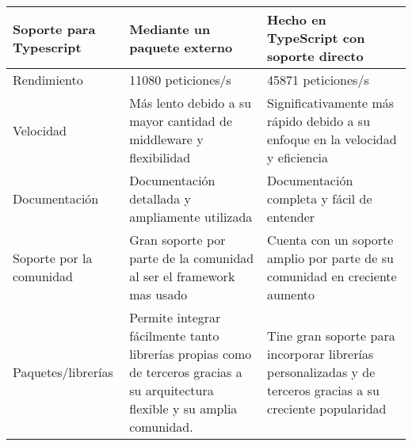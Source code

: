 \begin{longtable}{|p{3cm}|p{5cm}|p{5cm}|}
    \hline \hline
    \endlastfoot
    Soporte para Typescript                        & Mediante un paquete externo                                                                                                    & Hecho en TypeScript con soporte directo                                                                     \\\hline
    Rendimiento                                    & 11080 peticiones/s                                                                                                             & 45871 peticiones/s                                                                                          \\\hline
    Velocidad                                      & Más lento debido a su mayor cantidad de middleware y flexibilidad                                                              & Significativamente más rápido debido a su enfoque en la velocidad y eficiencia                              \\\hline
    Documentación                                  & Documentación detallada y ampliamente utilizada                                                                                & Documentación completa y fácil de entender                                                                  \\\hline
    Soporte por la comunidad                       & Gran soporte por parte de la comunidad al ser el framework mas usado                                                           & Cuenta con un soporte amplio por parte de su comunidad en creciente aumento                                 \\\hline
    Paquetes/librerías                             & Permite integrar fácilmente tanto librerías propias como de terceros gracias a su arquitectura flexible y su amplia comunidad. & Tine gran soporte para incorporar librerías personalizadas y de terceros gracias a su creciente popularidad \\
\end{longtable}